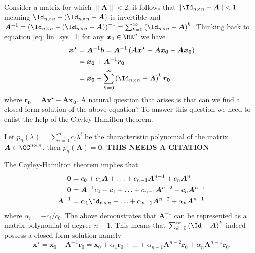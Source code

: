 Consider a matrix for which $\| \bm{A} \| < 2$, it follows that $\| \Id_{n \times n} - \bm{A} \| < 1$ meaning $\Id_{n \times n} - \left( \Id_{n \times n} - \bm{A} \right)$ is invertible and $\bm{A}^{-1} = \left( \Id_{n \times n} - \left( \Id_{n \times n} - \bm{A} \right) \right)^{-1} = \sum_{k=0}^{\infty} \left( \Id_{n \times n} - \bm{A} \right)^{k}$. Thinking back to equation \ref{eq: lin_sys_1} for any $\bm{x}_0 \in \RR^{n}$ we have
\begin{align*}
    \bm{x^{\star}} & = \bm{A}^{-1} \bm{b} = \bm{A}^{-1} \left( \bm{A} \bm{x^{\star}} - \bm{A} \bm{x_0} + \bm{A} \bm{x_0} \right) \\
                   & = \bm{x_0} + \bm{A}^{-1} \bm{r_0}                                                                           \\
                   & = \bm{x_0} + \sum_{k=0}^{\infty} \left( \Id_{n \times n} - \bm{A} \right)^k \bm{r_0}
\end{align*}
where $\bm{r_0} = \bm{A} \bm{x^{\star}} - \bm{A} \bm{x_0}$. A natural question that arises is that can we find a closed form solution of the above equation? To answer this question we need to enlist the help of the Cayley-Hamilton theorem.
\begin{thm} \label{theorem: cayley_amilton}
    Let $p_n \left( \lambda \right) = \sum_{i=0}^{n} c_i \lambda^{i}$ be the characteristic polynomial of the matrix $\bm{A} \in \CC^{n \times n}$, then $p_n \left( \bm{A} \right) = \bm{0}$. {\color{red} \textbf{THIS NEEDS A CITATION}}
\end{thm}
The Cayley-Hamilton theorem implies that
\begin{align*}
    \bm{0}      & = c_0 + c_1 \bm{A} + \ldots + c_{n-1} \bm{A}^{n-1} + c_{n} \bm{A}^{n}                      \\
    \bm{0}      & = \bm{A}^{-1} c_0 + c_1 + \ldots + c_{n-1} \bm{A}^{n-2} + c_{n} \bm{A}^{n-1}               \\
    \bm{A}^{-1} & = \alpha_1 \Id_{n \times n} + \ldots + \alpha_{n-1} \bm{A}^{n-2} + \alpha_{n} \bm{A}^{n-1}
\end{align*}
where $\alpha_i = -c_i / c_0$. The above demonstrates that $\bm{A}^{-1}$ can be represented as a matrix polynomial of degree $n-1$. This means that $\sum_{k=0}^{\infty} \left( \Id - \bm{A} \right)^k$ indeed possess a closed form solution namely
\begin{equation} \label{eq: x_ast_via_cayley}
    \bm{x^{\star}} = \bm{x}_0 + \bm{A}^{-1} \bm{r}_0 = \bm{x}_0 + \alpha_1 \bm{r}_0 + \ldots + \alpha_{n-1} \bm{A}^{n-2} \bm{r}_0 + \alpha_{n} \bm{A}^{n-1} \bm{r}_0.
\end{equation}
